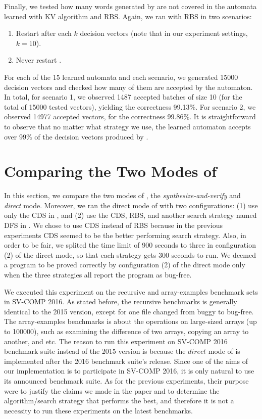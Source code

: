 Finally, we tested how many words generated by \CREST are not covered in the automata learned with KV algorithm and RBS. Again, we ran \CREST with RBS in two scenarios: 
\begin{enumerate}
	\item Restart \CREST after each $k$ decision vectors (note that in our experiment settings, $k = 10$).
	\item Never restart \CREST.
\end{enumerate}
For each of the 15 learned automata and each scenario, we generated 15000 decision vectors and checked how many of them are accepted by the automaton. In total, for scenario 1, we observed 1487 accepted batches of size 10 (for the total of 15000 tested vectors), yielding the correctness 99.13\%. For scenario 2, we observed 14977 accepted vectors, for the correctness 99.86\%. It is straightforward to observe that no matter what strategy we use, the learned automaton accepts over 99\% of the decision vectors produced by \CREST. 

\section{Comparing the Two Modes of \PACMAN}\label{sec:compare_learning_sampling}

In this section, we compare the two modes of \PACMAN, the \emph{synthesize-and-verify} and \emph{direct} mode. Moreover, we ran the direct mode of \PACMAN with two configurations: (1) use only the CDS in \CREST, and (2) use the CDS, RBS, and another search strategy named DFS in \CREST. We chose to use CDS instead of RBS because in the previous experiments CDS seemed to be the better performing search strategy. Also, in order to be fair, we splited the time limit of 900 seconds to three in configuration (2) of the direct mode, so that each strategy gets 300 seconds to run. We deemed a program to be proved correctly by configuration (2) of the direct mode only when the three strategies all report the program as bug-free. 

We executed this experiment on the recursive and array-examples benchmark sets in SV-COMP 2016. As stated before, the recursive benchmarks is generally identical to the 2015 version, except for one file changed from buggy to bug-free. The array-examples benchmarks is about the operations on large-sized arrays (up to 100000), such as examining the difference of two arrays, copying an array to another, and etc. The reason to run this experiment on SV-COMP 2016 benchmark suite instead of the 2015 version is because the $direct$ mode of \PACMAN is implemented after the 2016 benchmark suite's release. Since one of the aims of our implementation is to participate in SV-COMP 2016, it is only natural to use its announced benchmark suite. As for the previous experiments, their purpose were to justify the claims we made in the paper and to determine the algorithm/search strategy that performs the best, and therefore it is not a necessity to run these experiments on the latest benchmarks. 


